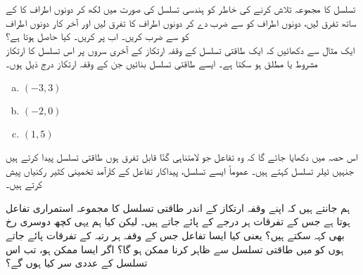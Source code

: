 تسلسل  کا مجموعہ تلاش کرنے کی خاطر  کو ہندسی تسلسل کی صورت میں لکھ کر دونوں اطراف کا  کے ساتھ تفرق لیں، دونوں اطراف کو  سے ضرب دے کر دونوں اطراف کا تفرق لیں اور آخر کار دونوں اطراف کو  سے ضرب کریں۔ اب  پر کریں۔ کیا حاصل ہوتا ہے؟
\\
ایک مثال سے دکھائیں کہ ایک طاقتی تسلسل کے وقفہ ارتکاز کے آخری سروں پر اس تسلسل کا ارتکاز مشروط یا مطلق ہو سکتا ہے۔
ایسے طاقتی تسلسل بنائیں جن کے وقفہ ارتکاز درج ذیل ہوں۔
\begin{multicols}{3}
\begin{enumerate}[a.]
\item
$(-3,3)$
\item
$(-2,0)$
\item
$(1,5)$
\end{enumerate}
\end{multicols}



اس حصہ میں دکھایا جائے گا کہ وہ تفاعل جو لامتناہی گنّا قابل تفرق ہوں طاقتی تسلسل پیدا کرتے ہیں جنہیں ٹیلر تسلسل کہتے ہیں۔  عموماً ایسے تسلسل، پیداکار تفاعل کے کارآمد تخمینی کثیر رکنیاں پیش کرتے ہیں۔

ہم جانتے ہیں کہ اپنے وقفہ ارتکاز کے اندر طاقتی تسلسل کا مجموعہ استمراری تفاعل ہوتا ہے جس کے تفرقات  ہر درجے کے پائے جاتے ہیں۔ لیکن کیا ہم یہی کچھ دوسری رخ بھی کہہ سکتے ہیں؟ یعنی کیا ایسا تفاعل  جس کے وقفہ  ہر رتبہ کے تفرقات پائے جاتے ہوں کو  میں طاقتی تسلسل سے ظاہر کرنا ممکن ہو گا؟ اگر ایسا ممکن ہو، تب اس تسلسل کے عددی سر کیا ہوں گے؟

